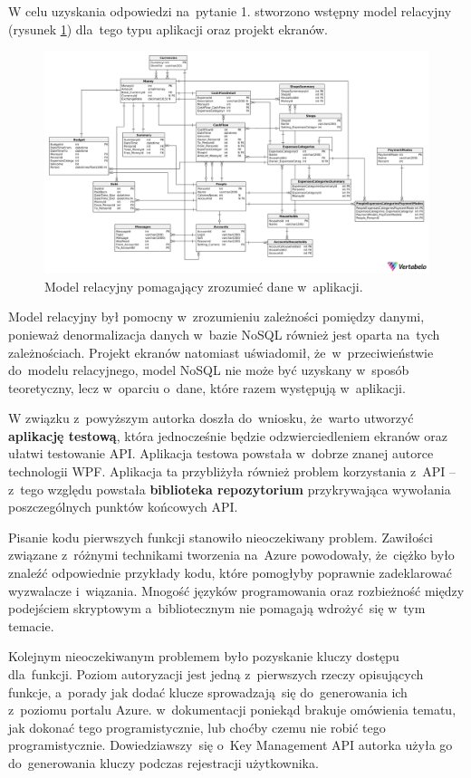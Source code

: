 \documentclass[12pt,a4paper,twoside,titlepage,openright]{book}
\begin{document}
W celu uzyskania odpowiedzi na~pytanie 1. stworzono wstępny model relacyjny (rysunek \ref{fig:model-relacyjny}) dla~tego typu aplikacji oraz projekt ekranów. 

\begin{figure}[h]
	\centering
			\includegraphics[width=\textwidth]{model-relacyjny.png}
		\caption{Model relacyjny pomagający zrozumieć dane w~aplikacji.}
		\label{fig:model-relacyjny}
\end{figure}

Model relacyjny był pomocny w~zrozumieniu zależności pomiędzy danymi, ponieważ denormalizacja danych w~bazie NoSQL również jest oparta na~tych zależnościach. Projekt ekranów natomiast uświadomił, że~w~przeciwieństwie do~modelu relacyjnego, model NoSQL nie może być uzyskany w~sposób teoretyczny, lecz w~oparciu o~dane, które razem występują w~aplikacji.

W związku z~powyższym autorka doszła do~wniosku, że~warto utworzyć \textbf{aplikację testową}, która jednocześnie będzie odzwierciedleniem ekranów oraz ułatwi testowanie API. Aplikacja testowa powstała w~dobrze znanej autorce technologii WPF. Aplikacja ta przybliżyła również problem korzystania z~API -- z~tego względu powstała \textbf{biblioteka repozytorium} przykrywająca wywołania poszczególnych punktów końcowych API. 

Pisanie kodu pierwszych funkcji stanowiło nieoczekiwany problem. Zawiłości związane z~różnymi technikami tworzenia na~Azure powodowały, że~ciężko było znaleźć odpowiednie przykłady kodu, które pomogłyby poprawnie zadeklarować wyzwalacze i~wiązania. Mnogość języków programowania oraz rozbieżność między podejściem skryptowym a~bibliotecznym nie pomagają wdrożyć~się w~tym temacie.

Kolejnym nieoczekiwanym problemem było pozyskanie kluczy dostępu dla~funkcji. Poziom autoryzacji jest jedną z~pierwszych rzeczy opisujących funkcje, a~porady jak dodać klucze sprowadzają~się do~generowania ich z~poziomu portalu Azure. w~dokumentacji poniekąd brakuje omówienia tematu, jak dokonać tego programistycznie, lub choćby czemu nie robić tego programistycznie. Dowiedziawszy~się o~Key Management API autorka użyła go do~generowania kluczy podczas rejestracji użytkownika.
\end{document}
